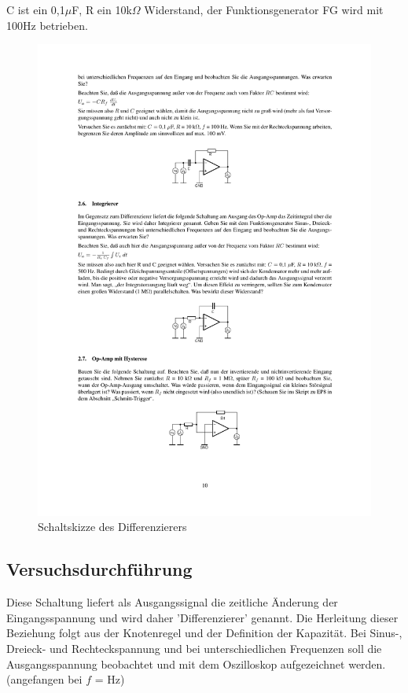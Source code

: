\documentclass[12pt,a4paper]{article}
\begin{document}
C ist ein 0,1$\mu$F, R ein 10k$\Omega$ Widerstand, der Funktionsgenerator FG wird mit 100Hz betrieben.

\begin{figure}[H] 
  \centering
    \includegraphics[trim = 10mm 200mm 10mm 60mm, clip, scale = 1]{ep4_14[Page10].pdf}
  	\caption[Schaltskizze des Differenzierers]{Schaltskizze des Differenzierers\footnotemark}
  \label{fig:1}
\end{figure}

\subsection{Versuchsdurchführung}
Diese Schaltung liefert als Ausgangssignal die zeitliche Änderung der Eingangsspannung und wird daher 'Differenzierer' genannt. Die Herleitung dieser Beziehung folgt aus der Knotenregel und der Definition der Kapazität. Bei Sinus-, Dreieck- und Rechteckspannung und bei unterschiedlichen Frequenzen soll die Ausgangsspannung beobachtet und mit dem Oszilloskop aufgezeichnet werden.(angefangen bei $f$ = \unit[100]{Hz})
\end{document}
